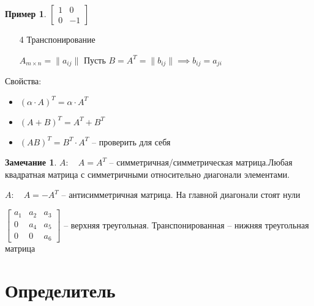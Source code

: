 \documentclass{book}
\theoremstyle{definition}
\newtheorem*{note}{Замечание}
\newtheorem*{example}{Пример}
\begin{document}
    \begin{example}
        $\begin{bmatrix} 1&0\\0&-1 \end{bmatrix} $
    \end{example}

    \begin{enumerate}
        \item [4] Транспонирование

            $A_{m\times n} = \| a_{ij} \|   $ Пусть $B = A^T = \| b_{ij} \| \implies  b_{ij} = a_{ji}$
    \end{enumerate}

    Свойства:
    \begin{itemize}
        \item $\left( \alpha \cdot A \right)^T = \alpha\cdot A^T $
        \item $(A+B)^T = A^T + B^T$
        \item $(AB)^T = B^T\cdot A^T$ -- проверить для себя
    \end{itemize}

    \begin{note}
        $A:\quad A=A^T$ -- симметричная/симметрическая матрица.Любая квадратная матрица с симметричными относительно диагонали элементами.

        $A:\quad A = -A^T$ -- антисимметричная матрица. На главной диагонали стоят нули

        $\begin{bmatrix} a_1&a_2&a_3\\ 0&a_4&a_5\\0&0&a_6 \end{bmatrix} $ -- верхняя треугольная. Транспонированная -- нижняя треугольная матрица
    \end{note}
   

    \section{Определитель}
\end{document}
